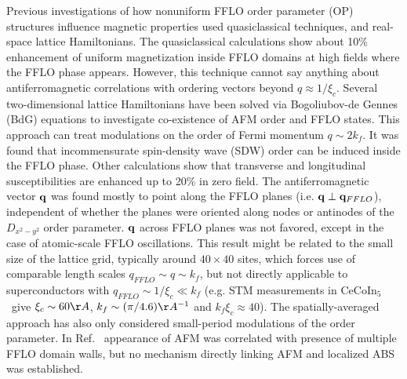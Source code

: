 \documentclass[prb,aps,showpacs,amsmath,twocolumn,10pt]{revtex4-1}
\newcommand{\cecoin}{CeCoIn$_5$}
\begin{document}
Previous investigations of how nonuniform FFLO order parameter (OP) 
structures influence magnetic properties used quasiclassical techniques,
and real-space lattice Hamiltonians. 
The quasiclassical calculations\cite{Burkhardt1994,Vorontsov:2006fc} 
show about 10\% enhancement of uniform 
magnetization inside FFLO domains at high fields where the FFLO phase appears. 
However, this technique cannot say anything about antiferromagnetic correlations 
with ordering vectors beyond $q \approx 1/\xi_c$. 
Several two-dimensional lattice Hamiltonians have been solved via Bogoliubov-de Gennes (BdG) equations 
to investigate co-existence of AFM order and FFLO states.\cite{Yanase2009, Yanase2009abs, Marcin2009, Yanase2011} 
This approach can treat modulations on the order of Fermi momentum $q \sim 2k_f$. 
It was found that incommensurate spin-density wave (SDW) order
can be induced inside the FFLO phase.\cite{Yanase2009,Yanase2009abs} 
Other calculations show that transverse and longitudinal susceptibilities are enhanced up to 20\% in zero
field.\cite{Marcin2009}
The antiferromagnetic vector ${\bf q}$ was found mostly to point along the FFLO planes (i.e. ${\bf q}\perp{\bf q}_{FFLO}$),\cite{Yanase2009,Yanase2009abs} 
independent of whether the planes were oriented along nodes or
antinodes of the $D_{x^2-y^2}$ order parameter. 
${\bf q}$ across FFLO planes was not favored, except in the case of
atomic-scale {FFLO} oscillations.\cite{Marcin2009,Yanase2011}
This result might be related to the small size of the lattice grid, typically around $40\times40$ sites, 
which forces use of comparable length scales $q_{FFLO} \sim q \sim k_f$, 
but not directly applicable to superconductors with $ q_{FFLO} \sim 1/\xi_c \ll k_f$ 
(e.g. STM measurements\cite{Zhou:2013dq,Allan2013_stm115} in \cecoin\ give 
$\xi_c \sim 60 \AA$, $k_f \sim (\pi/4.6) \AA^{-1}$ and $k_f \xi_c \approx 40$).
The spatially-averaged approach\cite{Marcin2009} has also only considered
small-period modulations of the order parameter. 
In Ref.~ 
appearance of AFM was correlated with presence of multiple FFLO domain walls,
but no mechanism directly linking AFM and localized ABS was established. 
\end{document}
